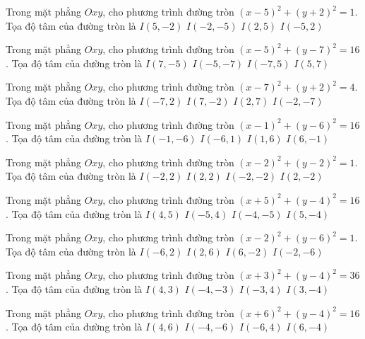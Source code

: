 \begin{ex}
Trong mặt phẳng $Oxy$, cho phương trình đường tròn $(x -5)^2   + (y + 2)^2 = 1$. Tọa độ tâm của đường tròn là
\choice
{ \True $I(5, -2)$ }
{ $I(-2, -5)$ }
{ $I(2, 5)$ }
{ $I(-5, 2)$ }
\end{ex}

\begin{ex}
Trong mặt phẳng $Oxy$, cho phương trình đường tròn $(x -5)^2   + (y -7)^2 = 16$. Tọa độ tâm của đường tròn là
\choice
{ $I(7, -5)$ }
{ $I(-5, -7)$ }
{ $I(-7, 5)$ }
{ \True $I(5, 7)$ }
\end{ex}

\begin{ex}
Trong mặt phẳng $Oxy$, cho phương trình đường tròn $(x -7)^2   + (y + 2)^2 = 4$. Tọa độ tâm của đường tròn là
\choice
{ $I(-7, 2)$ }
{ \True $I(7, -2)$ }
{ $I(2, 7)$ }
{ $I(-2, -7)$ }
\end{ex}

\begin{ex}
Trong mặt phẳng $Oxy$, cho phương trình đường tròn $(x -1)^2   + (y -6)^2 = 16$. Tọa độ tâm của đường tròn là
\choice
{ $I(-1, -6)$ }
{ $I(-6, 1)$ }
{ \True $I(1, 6)$ }
{ $I(6, -1)$ }
\end{ex}

\begin{ex}
Trong mặt phẳng $Oxy$, cho phương trình đường tròn $(x -2)^2   + (y -2)^2 = 1$. Tọa độ tâm của đường tròn là
\choice
{ $I(-2, 2)$ }
{ \True $I(2, 2)$ }
{ $I(-2, -2)$ }
{ $I(2, -2)$ }
\end{ex}

\begin{ex}
Trong mặt phẳng $Oxy$, cho phương trình đường tròn $(x + 5)^2  + (y -4)^2 = 16$. Tọa độ tâm của đường tròn là
\choice
{ $I(4, 5)$ }
{ \True $I(-5, 4)$ }
{ $I(-4, -5)$ }
{ $I(5, -4)$ }
\end{ex}

\begin{ex}
Trong mặt phẳng $Oxy$, cho phương trình đường tròn $(x -2)^2   + (y -6)^2 = 1$. Tọa độ tâm của đường tròn là
\choice
{ $I(-6, 2)$ }
{ \True $I(2, 6)$ }
{ $I(6, -2)$ }
{ $I(-2, -6)$ }
\end{ex}

\begin{ex}
Trong mặt phẳng $Oxy$, cho phương trình đường tròn $(x + 3)^2  + (y -4)^2 = 36$. Tọa độ tâm của đường tròn là
\choice
{ $I(4, 3)$ }
{ $I(-4, -3)$ }
{ \True $I(-3, 4)$ }
{ $I(3, -4)$ }
\end{ex}

\begin{ex}
Trong mặt phẳng $Oxy$, cho phương trình đường tròn $(x + 6)^2  + (y -4)^2 = 16$. Tọa độ tâm của đường tròn là
\choice
{ $I(4, 6)$ }
{ $I(-4, -6)$ }
{ \True $I(-6, 4)$ }
{ $I(6, -4)$ }
\end{ex}

